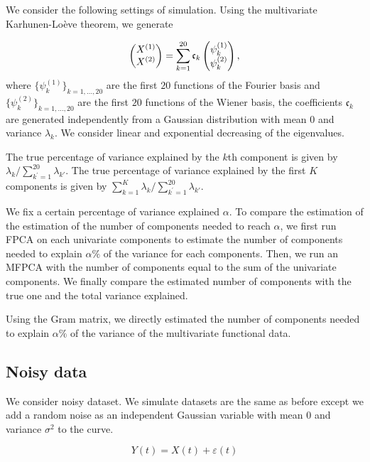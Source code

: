 We consider the following settings of simulation. Using the multivariate Karhunen-Loève theorem, we generate

\begin{equation}\label{eq:simu_var_explained}
\begin{pmatrix} X^{(1)} \\ X^{(2)} \end{pmatrix} = \sum_{k = 1}^{20} \mathfrak{c}_k \begin{pmatrix} \psi_k^{(1)} \\ \psi_k^{(2)} \end{pmatrix},
\end{equation}
where $\{\psi_k^{(1)}\}_{k = 1, \dots, 20}$ are the first $20$ functions of the Fourier basis and $\{\psi_k^{(2)}\}_{k = 1, \dots, 20}$ are the first $20$ functions of the Wiener basis, the coefficients $\mathfrak{c}_k$ are generated independently from a Gaussian distribution with mean $0$ and variance $\lambda_k$. We consider linear and exponential decreasing of the eigenvalues.

The true percentage of variance explained by the $k$th component is given by
$\lambda_k / \sum_{k^\prime = 1}^{20} \lambda_{k\prime}$. The true percentage of variance explained by the first $K$ components is given by $\sum_{k = 1}^K \lambda_k / \sum_{k^\prime = 1}^{20} \lambda_{k\prime}$.

We fix a certain percentage of variance explained $\alpha$. To compare the estimation of the estimation of the number of components needed to reach $\alpha$, we first run FPCA on each univariate components to estimate the number of components needed to explain $\alpha\%$ of the variance for each components. Then, we run an MFPCA with the number of components equal to the sum of the univariate components. We finally compare the estimated number of components with the true one and the total variance explained.

Using the Gram matrix, we directly estimated the number of components needed to explain $\alpha\%$ of the variance of the multivariate functional data.


\subsection{Noisy data} %
\label{sub:noisy_data}

We consider noisy dataset. We simulate datasets are the same as before except we add a random noise as an independent Gaussian variable with mean $0$ and variance $\sigma^2$ to the curve.

\begin{equation}\label{eq:noisy_curves}
    Y(t) = X(t) + \varepsilon(t)
\end{equation}


